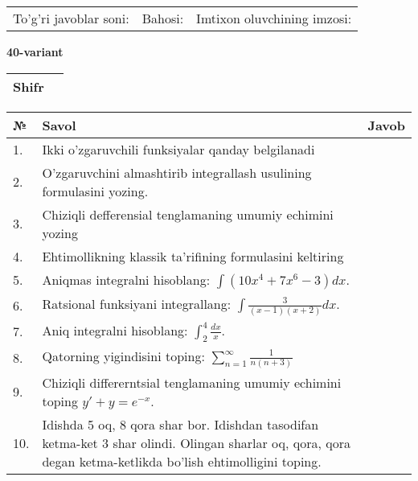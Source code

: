 \documentclass{article}
\begin{document}
  \vspace{1cm}
  
  \begin{tabular}{lll}
  To'g'ri javoblar soni: \underline{\hspace{1.5cm}} & 
  Bahosi: \underline{\hspace{1.5cm}} & 
  Imtixon oluvchining imzosi: \underline{\hspace{2cm}} \\
  \end{tabular}
  
  \egroup
  
  \newpage
  
  
  \textbf{40-variant}\\
  
  \bgroup
  \def\arraystretch{1.6} %
  
  \begin{tabular}{|m{5.7cm}|m{9.5cm}|}
  \hline
  Shifr & \\
  \hline
  \end{tabular}
  
  \vspace{1cm}
  
  \begin{tabular}{|m{0.7cm}|m{10cm}|m{4cm}|}
  \hline
  № & Savol & Javob \\
  \hline
  1. & Ikki o'zgaruvchili funksiyalar qanday belgilanadi &  \\
  \hline
  2. & O'zgaruvchini almashtirib integrallash usulining formulasini yozing. &  \\
  \hline
  3. & Chiziqli defferensial tenglamaning umumiy echimini yozing &  \\
  \hline
  4. & Ehtimollikning klassik ta'rifining formulasini keltiring &  \\
  \hline
  5. & Aniqmas integralni hisoblang: \(\int {\left( 10x^{4} + 7x^{6} - 3 \right)dx}\). &  \\
  \hline
  6. & Ratsional funksiyani integrallang: \(\int {\frac{3}{(x - 1)(x + 2)}dx}\). &  \\
  \hline
  7. & Aniq integralni hisoblang: \(\int_{2}^{4}\frac{dx}{x}\). &  \\
  \hline
  8. & Qatorning yigindisini toping: \(\sum_{n = 1}^{\infty}\frac{1}{n(n + 3)}\) &  \\
  \hline
  9. & Chiziqli differerntsial tenglamaning umumiy echimini toping \(y' + y = e^{- x}\). &  \\
  \hline
  10. & Idishda 5 oq, 8 qora shar bor. Idishdan tasodifan ketma-ket 3 shar olindi. Olingan sharlar oq, qora, qora degan ketma-ketlikda bo'lish ehtimolligini toping. &  \\
  \hline
  \end{tabular}
  
\end{document}
